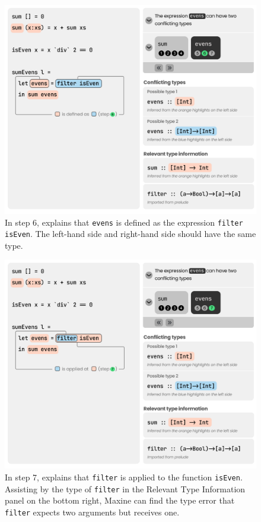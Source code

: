 \begin{figure}
        \centering
        \includegraphics[width=\linewidth]{images/advanced-mode-2.pdf}
        \caption{
            In step 6, \chameleon{} 
            explains that \texttt{evens} is defined as
            the expression \texttt{filter isEven}. The left-hand side
            and right-hand side should have the same type.
        }
        \label{fig:advanced-mode-step6}
\end{figure}

\begin{figure}
        \centering
        \includegraphics[width=\linewidth]{images/advanced-mode-3.pdf}
        \caption{
            In step 7, \chameleon{} 
            explains that \texttt{filter} is applied to 
            the function \texttt{isEven}. Assisting by 
            the type of \texttt{filter} in the 
            Relevant Type Information panel on the bottom
            right, Maxine can find the type error that 
            \texttt{filter} expects two arguments but receives one.
        }
        \label{fig:advanced-mode-step7}
\end{figure}



